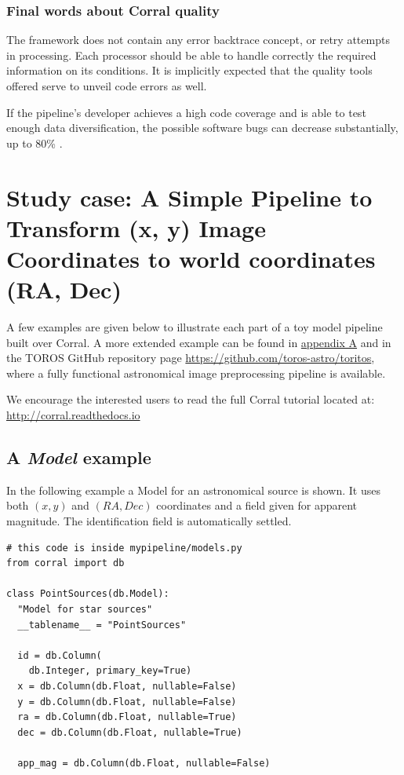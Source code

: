 \documentclass[final,5p,times,twocolumn,authoryear]{elsarticle}
\begin{document}
\subsubsection{Final words about Corral quality}
The framework does not contain any error backtrace concept, or retry attempts in
processing. Each processor should be able to handle correctly the required information on its conditions.
It is implicitly expected that the quality tools offered serve to unveil code errors as well.

If the pipeline's developer achieves a high code coverage and is able to test enough data
diversification, the possible software bugs can decrease substantially, up to 80\% \citep{jeffries2007guest}.
%
\section{Study case: A Simple Pipeline to Transform (x, y) Image Coordinates to world coordinates (RA, Dec)}
\label{case:code_examples}
A few examples are given below to illustrate each part of a toy model pipeline
built over Corral.
%
A more extended example can be found in \hyperref[appendixa]{appendix A} and in the
TOROS GitHub repository page \url{https://github.com/toros-astro/toritos}, where a fully functional astronomical
image preprocessing pipeline is available.

We encourage the interested users to read the full Corral tutorial located at:
\url{http://corral.readthedocs.io}
%
\subsection{A \textit{Model} example}
In the following example a Model for an astronomical source is shown. It uses
both $(x,y)$ and $(RA, Dec)$ coordinates and a field given for apparent magnitude.
The identification field is automatically settled.
%
\begin{verbatim}
# this code is inside mypipeline/models.py
from corral import db

class PointSources(db.Model):
  "Model for star sources"
  __tablename__ = "PointSources"

  id = db.Column(
    db.Integer, primary_key=True)
  x = db.Column(db.Float, nullable=False)
  y = db.Column(db.Float, nullable=False)
  ra = db.Column(db.Float, nullable=True)
  dec = db.Column(db.Float, nullable=True)

  app_mag = db.Column(db.Float, nullable=False)
\end{verbatim}
%
%
\end{document}
